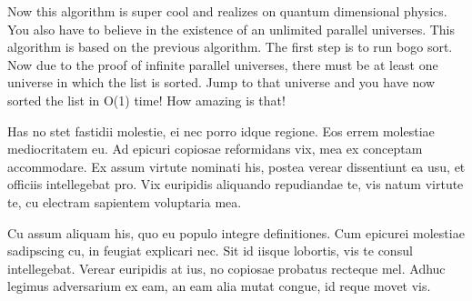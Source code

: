 \documentclass[9pt]{extarticle} %
\begin{document}
\begin{minipage}[t]{.61\linewidth}
Now this algorithm is super cool and realizes on quantum dimensional physics. You also have to believe in the existence of an unlimited parallel universes. This algorithm is based on the previous algorithm. The first step is to run bogo sort. Now due to the proof of infinite parallel universes, there must be at least one universe in which the list is sorted. Jump to that universe and you have now sorted the list in O(1) time! How amazing is that!


\hypertarget{secondnews}{} 

Has no stet fastidii molestie, ei nec porro idque regione. Eos errem molestiae mediocritatem eu. Ad epicuri copiosae reformidans vix, mea ex conceptam accommodare. Ex assum virtute nominati his, postea verear dissentiunt ea usu, et officiis intellegebat pro. Vix euripidis aliquando repudiandae te, vis natum virtute te, cu electram sapientem voluptaria mea.

Cu assum aliquam his, quo eu populo integre definitiones. Cum epicurei molestiae sadipscing cu, in feugiat explicari nec. Sit id iisque lobortis, vis te consul intellegebat. Verear euripidis at ius, no copiosae probatus recteque mel. Adhuc legimus adversarium ex eam, an eam alia mutat congue, id reque movet vis.

\end{minipage} %
\end{document}
